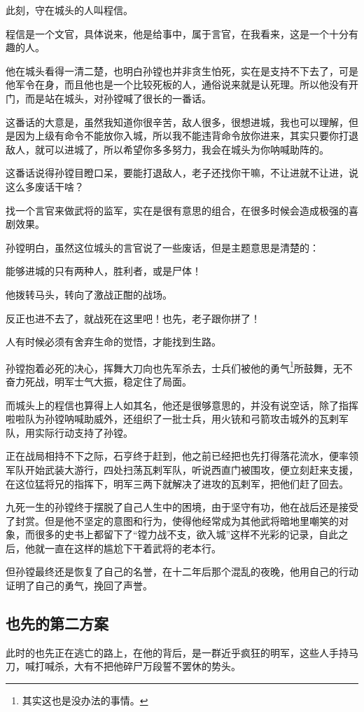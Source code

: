 \begin{multicols}{\theparacolNo}
此刻，守在城头的人叫程信。

程信是一个文官，具体说来，他是给事中，属于言官，在我看来，这是一个十分有趣的人。

他在城头看得一清二楚，也明白孙镗也并非贪生怕死，实在是支持不下去了，可是他军令在身，而且他也是一个比较死板的人，通俗说来就是认死理。所以他没有开门，而是站在城头，对孙镗喊了很长的一番话。

这番话的大意是，虽然我知道你很辛苦，敌人很多，很想进城，我也可以理解，但是因为上级有命令不能放你入城，所以我不能违背命令放你进来，其实只要你打退敌人，就可以进城了，所以希望你多多努力，我会在城头为你呐喊助阵的。

这番话说得孙镗目瞪口呆，要能打退敌人，老子还找你干嘛，不让进就不让进，说这么多废话干啥？

找一个言官来做武将的监军，实在是很有意思的组合，在很多时候会造成极强的喜剧效果。

孙镗明白，虽然这位城头的言官说了一些废话，但是主题意思是清楚的：

能够进城的只有两种人，胜利者，或是尸体！

他拨转马头，转向了激战正酣的战场。

反正也进不去了，就战死在这里吧！也先，老子跟你拼了！

人有时候必须有舍弃生命的觉悟，才能找到生路。

孙镗抱着必死的决心，挥舞大刀向也先军杀去，士兵们被他的勇气\footnote{其实这也是没办法的事情。}所鼓舞，无不奋力死战，明军士气大振，稳定住了局面。

而城头上的程信也算得上人如其名，他还是很够意思的，并没有说空话，除了指挥啦啦队为孙镗呐喊助威外，还组织了一批士兵，用火铳和弓箭攻击城外的瓦剌军队，用实际行动支持了孙镗。

正在战局相持不下之际，石亨终于赶到，他之前已经把也先打得落花流水，便率领军队开始武装大游行，四处扫荡瓦剌军队，听说西直门被围攻，便立刻赶来支援，在这位猛将兄的指挥下，明军三两下就解决了进攻的瓦剌军，把他们赶了回去。

九死一生的孙镗终于摆脱了自己人生中的困境，由于坚守有功，他在战后还是接受了封赏。但是他不坚定的意图和行为，使得他经常成为其他武将暗地里嘲笑的对象，而很多的史书上都留下了“镗力战不支，欲入城”这样不光彩的记录，自此之后，他就一直在这样的尴尬下干着武将的老本行。

但孙镗最终还是恢复了自己的名誉，在十二年后那个混乱的夜晚，他用自己的行动证明了自己的勇气，挽回了声誉。

\subsection{也先的第二方案}
此时的也先正在逃亡的路上，在他的背后，是一群近乎疯狂的明军，这些人手持马刀，喊打喊杀，大有不把他碎尸万段誓不罢休的势头。


\end{multicols}
